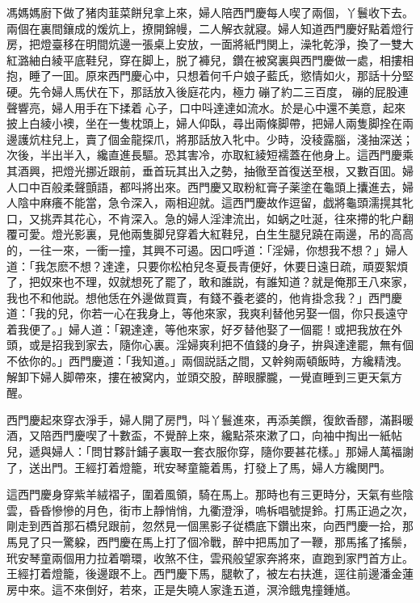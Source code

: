馮媽媽廚下做了猪肉韮菜餅兒拿上來，婦人陪西門慶每人喫了兩個，丫鬟收下去。兩個在裏間鑲成的煖炕上，撩開錦幔，二人解衣就寢。婦人知道西門慶好點着燈行房，把燈臺移在明間炕邊一張桌上安放，一面將紙門関上，澡牝乾淨，換了一雙大紅潞紬白綾平底鞋兒，穿在脚上，脱了褲兒，鑽在被窝裏與西門慶做一處，相摟相抱，睡了一囬。原來西門慶心中，只想着何千户娘子藍氏，慾情如火，那話十分堅硬。先令婦人馬伏在下，那話放入後庭花内，極力𢵞磞了約二三百度，𢵞磞的屁股連聲響亮，婦人用手在下揉着𣭈心子，口中呌達達如流水。於是心中還不美意，起來披上白綾小襖，坐在一隻枕頭上，婦人仰臥，尋出兩條脚帶，把婦人兩隻脚拴在兩邊護炕柱兒上，賣了個金龍探爪，將那話放入牝中。少時，没稜露腦，淺抽深送；次後，半出半入，纔直進長驅。恐其害冷，亦取紅綾短襦蓋在他身上。這西門慶乘其酒興，把燈光挪近跟前，垂首玩其出入之勢，抽徹至首復送至根，又數百囬。婦人口中百般柔聲顫語，都呌將出來。西門慶又取粉紅膏子薬塗在龜頭上攮進去，婦人陰中麻癢不能當，急令深入，兩相迎就。這西門慶故作逗留，戯將龜頭濡㨪其牝口，又挑弄其花心，不肯深入。急的婦人淫津流出，如蜗之吐涎，往來摕的牝户翻覆可愛。燈光影裏，見他兩隻脚兒穿着大紅鞋兒，白生生腿兒蹺在兩邊，吊的高高的，一往一來，一衝一撞，其興不可遏。因口呼道：「淫婦，你想我不想？」婦人道：「我怎麽不想？達達，只要你松柏兒冬夏長青便好，休要日遠日疏，頑耍絮煩了，把奴來也不理，奴就想死了罷了，敢和誰説，有誰知道？就是俺那王八來家，我也不和他説。想他恁在外邊做買賣，有錢不養老婆的，他肯掛念我？」西門慶道：「我的兒，你若一心在我身上，等他來家，我爽利替他另娶一個，你只長遠守着我便了。」婦人道：「親達達，等他來家，好歹替他娶了一個罷！或把我放在外頭，或是招我到家去，隨你心裏。淫婦爽利把不值錢的身子，拚與達達罷，無有個不依你的。」西門慶道：「我知道。」兩個説話之間，又幹夠兩頓飯時，方纔精洩。解卸下婦人脚帶來，摟在被窝内，並頭交股，醉眼朦朧，一覺直睡到三更天氣方醒。

西門慶起來穿衣淨手，婦人開了房門，呌丫鬟進來，再添美饌，復飲香醪，滿斟暖酒，又陪西門慶喫了十數盃，不覺醉上來，纔點茶來漱了口，向袖中掏出一紙帖兒，遞與婦人：「問甘夥計鋪子裏取一套衣服你穿，隨你要甚花樣。」那婦人萬福謝了，送出門。王經打着燈籠，玳安琴童籠着馬，打發上了馬，婦人方纔関門。

這西門慶身穿紫羊絨褶子，圍着風領，騎在馬上。那時也有三更時分，天氣有些陰雲，昏昏慘慘的月色，街巿上靜悄悄，九衢澄淨，嗚柝唱號提鈴。打馬正過之次，剛走到西首那石橋兒跟前，忽然見一個黑影子従橋底下鑽出來，向西門慶一拾，那馬見了只一驚躱，西門慶在馬上打了個冷戰，醉中把馬加了一鞭，那馬搖了搖鬃，玳安琴童兩個用力拉着嚼環，收煞不住，雲飛般望家奔將來，直跑到家門首方止。王經打着燈籠，後邊跟不上。西門慶下馬，腿軟了，被左右扶進，逕往前邊潘金蓮房中來。這不來倒好，若來，正是失曉人家逢五道，溟泠餓鬼撞鍾馗。


